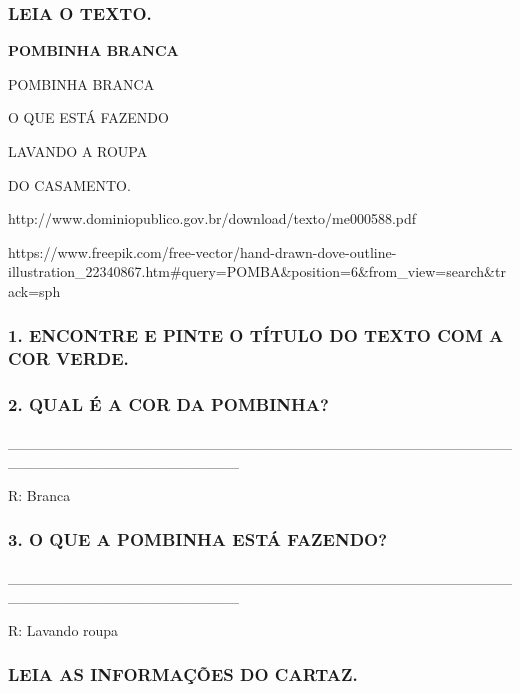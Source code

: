 \subsubsection{LEIA O TEXTO.}\label{leia-o-texto.}

\textbf{POMBINHA BRANCA}

POMBINHA BRANCA

O QUE ESTÁ FAZENDO

LAVANDO A ROUPA

DO CASAMENTO.

\protect\hypertarget{_heading=h.1ksv4uv}{}{}http://www.dominiopublico.gov.br/download/texto/me000588.pdf

https://www.freepik.com/free-vector/hand-drawn-dove-outline-illustration\_22340867.htm\#query=POMBA\&position=6\&from\_view=search\&track=sph

\subsubsection{1. ENCONTRE E PINTE O TÍTULO DO TEXTO COM A COR
VERDE.}\label{encontre-e-pinte-o-tuxedtulo-do-texto-com-a-cor-verde.}

\subsubsection{2. QUAL É A COR DA
POMBINHA?}\label{qual-uxe9-a-cor-da-pombinha}

\_\_\_\_\_\_\_\_\_\_\_\_\_\_\_\_\_\_\_\_\_\_\_\_\_\_\_\_\_\_\_\_\_\_\_\_\_\_\_\_\_\_\_\_\_\_\_\_\_\_\_\_\_\_\_\_\_\_\_\_\_\_\_\_\_\_\_\_\_\_

R: Branca

\subsubsection{3. O QUE A POMBINHA ESTÁ
FAZENDO?}\label{o-que-a-pombinha-estuxe1-fazendo}

\_\_\_\_\_\_\_\_\_\_\_\_\_\_\_\_\_\_\_\_\_\_\_\_\_\_\_\_\_\_\_\_\_\_\_\_\_\_\_\_\_\_\_\_\_\_\_\_\_\_\_\_\_\_\_\_\_\_\_\_\_\_\_\_\_\_\_\_\_\_

R: Lavando roupa

\subsubsection{LEIA AS INFORMAÇÕES DO
CARTAZ.}\label{leia-as-informauxe7uxf5es-do-cartaz.}

